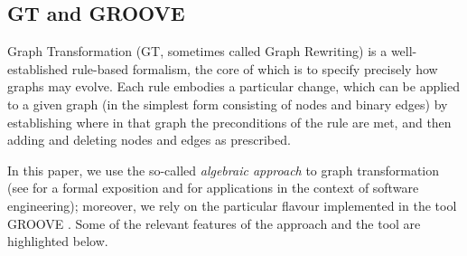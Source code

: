 
\subsection{GT and GROOVE}\label{sec:GTS}

Graph Transformation (GT, sometimes called Graph Rewriting) is a well-established rule-based formalism, the core of which is to specify precisely how graphs may evolve. Each rule embodies a particular change, which can be applied to a given graph (in the simplest form consisting of nodes and binary edges) by establishing where in that graph the preconditions of the rule are met, and then adding and deleting nodes and edges as prescribed.

In this paper, we use the so-called \emph{algebraic approach} to graph transformation (see \cite{DBLP:series/eatcs/EhrigEPT06} for a formal exposition and \cite{DBLP:books/sp/HeckelT20} for applications in the context of software engineering); moreover, we rely on the particular flavour implemented in the tool GROOVE \cite{DBLP:journals/sttt/GhamarianMRZZ12,GROOVE}. Some of the relevant features of the approach and the tool are highlighted below.
%
%
%
%
